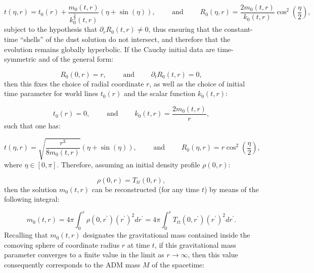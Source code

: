 \documentclass{article}
\begin{document}
\begin{equation}
t \left( \eta, r \right) = t_0 \left( r \right) + \frac{m_0 \left( t, r \right)}{k_{0}^{\frac{3}{2}} \left( t, r \right)} \left( \eta + \sin \left( \eta \right) \right), \qquad \text{ and } \qquad R_0 \left( \eta, r \right) = \frac{2 m_0 \left( t, r \right)}{k_0 \left( t, r \right)} \cos^2 \left( \frac{\eta}{2} \right),
\end{equation}
subject to the hypothesis that ${\partial_r R_0 \left( t, r \right) \neq 0}$, thus ensuring that the constant-time ``shells'' of the dust solution do not intersect, and therefore that the evolution remains globally hyperbolic. If the Cauchy initial data are time-symmetric and of the general form:

\begin{equation}
R_0 \left( 0, r \right) = r, \qquad \text{ and } \qquad \partial_t R_0 \left( t, r \right) = 0,
\end{equation}
then this fixes the choice of radial coordinate $r$, as well as the choice of initial time parameter for world lines ${t_0 \left( r \right)}$ and the scalar function ${k_0 \left( t, r \right)}$:

\begin{equation}
t_0 \left( r \right) = 0, \qquad \text{ and } \qquad k_0 \left( t, r \right) = \frac{2 m_0 \left( t, r \right)}{r},
\end{equation}
such that one has:

\begin{equation}
t \left( \eta, r \right) = \sqrt{\frac{r^3}{8 m_0 \left( t, r \right)}} \left( \eta + \sin \left( \eta \right) \right), \qquad \text{ and } \qquad R_0 \left( \eta, r \right) = r \cos^2 \left( \frac{\eta}{2} \right),
\end{equation}
where ${\eta \in \left[ 0, \pi \right]}$. Therefore, assuming an initial density profile ${\rho \left( 0, r \right)}$:

\begin{equation}
\rho \left( 0, r \right) = T_{t t} \left( 0, r \right),
\end{equation}
then the solution ${m_0 \left( t, r \right)}$ can be reconstructed (for any time $t$) by means of the following integral:

\begin{equation}
m_0 \left( t, r \right) = 4\pi \int_{0}^{r} \rho \left( 0, r^{\prime} \right) \left( r^{\prime} \right)^2 d r^{\prime} = 4 \pi \int_{0}^{r} T_{t t} \left( 0, r^{\prime} \right) \left( r^{\prime} \right)^2 d r^{\prime}.
\end{equation}
Recalling that ${m_0 \left( t, r \right)}$ designates the gravitational mass contained inside the comoving sphere of coordinate radius $r$ at time $t$, if this gravitational mass parameter converges to a finite value in the limit as ${r \to \infty}$, then this value consequently corresponds to the ADM mass $M$ of the spacetime:
\end{document}
